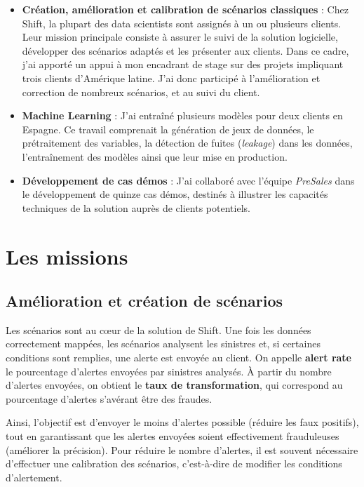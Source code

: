 \documentclass [twoside,openright,a4paper,11pt,french] {report}
\begin{document}
\begin{itemize}
    \item \textbf{Création, amélioration et calibration de scénarios classiques} : Chez Shift, la plupart
     des data scientists sont assignés à un ou plusieurs clients. Leur mission principale consiste à assurer
      le suivi de la solution logicielle, développer des scénarios adaptés et les présenter aux clients.
       Dans ce cadre, j'ai apporté un appui à mon encadrant de stage sur des projets impliquant trois clients d'Amérique latine.
       J'ai donc participé à l'amélioration et correction de nombreux scénarios, et au suivi du client.
    
    \item \textbf{Machine Learning} : J'ai entraîné plusieurs modèles pour deux clients en Espagne. Ce travail comprenait 
    la génération de jeux de données, le prétraitement des variables, 
    la détection de fuites (\textit{leakage}) dans les données, l'entraînement des modèles ainsi que leur mise en production.
    
    \item \textbf{Développement de cas démos} : J'ai collaboré avec l'équipe \textit{PreSales} dans le développement
     de quinze cas démos, destinés à illustrer les capacités techniques de la solution auprès de clients potentiels.
\end{itemize}



\chapter{Les missions}
\label {chap:contexte}
\section{Amélioration et création de scénarios}

Les scénarios sont au cœur de la solution de Shift. Une fois les données correctement 
mappées, les scénarios analysent les sinistres et, si certaines conditions sont 
remplies, une alerte est envoyée au client. On appelle \textbf{alert rate} le 
pourcentage d'alertes envoyées par sinistres analysés. À partir du nombre d'alertes 
envoyées, on obtient le \textbf{taux de transformation}, qui correspond au 
pourcentage d'alertes s'avérant être des fraudes.

Ainsi, l'objectif est d'envoyer le moins d'alertes possible (réduire les faux 
positifs), tout en garantissant que les alertes envoyées soient effectivement 
frauduleuses (améliorer la précision). Pour réduire le nombre d'alertes, il est 
souvent nécessaire d'effectuer une calibration des scénarios, c'est-à-dire de modifier 
les conditions d'alertement.
\end{document}
